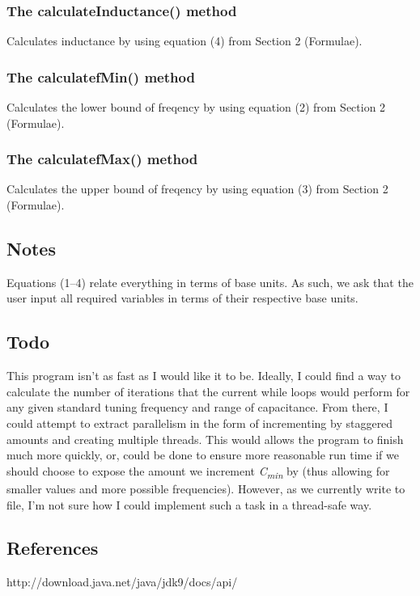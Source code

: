 \documentclass[12pt]{article}
\begin{document}
\subsubsection{The calculateInductance() method}
Calculates inductance by using equation (4) from Section 2 (Formulae).
\subsubsection{The calculatefMin() method}
Calculates the lower bound of freqency by using equation (2) from Section 2 (Formulae).
\subsubsection{The calculatefMax() method}
Calculates the upper bound of freqency by using equation (3) from Section 2 (Formulae).



\newpage %



\begin{center}
\section{Notes}
\end{center}
Equations (1--4) relate everything in terms of base units. As such, we ask that the user input all required variables in terms of their respective base units.

\subsection{Todo}
This program isn't as fast as I would like it to be. Ideally, I could find a way to calculate the number of iterations that the current while loops would perform for any given standard tuning frequency and range of capacitance. From there, I could attempt to extract parallelism in the form of incrementing by staggered amounts and creating multiple threads. This would allows the program to finish much more quickly, or, could be done to ensure more reasonable run time if we should choose to expose the amount we increment \textit{C\textsubscript{min}} by (thus allowing for smaller values and more possible frequencies). However, as we currently write to file, I'm not sure how I could implement such a task in a thread-safe way.



\newpage %



\begin{center}
\section{References}
\end{center}
http://download.java.net/java/jdk9/docs/api/
\end{document}
